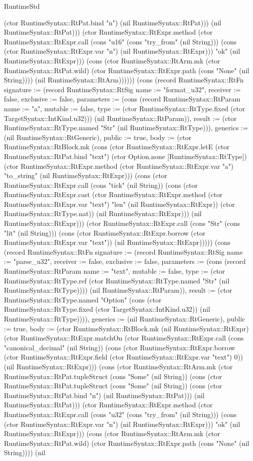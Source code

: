 \begin{lexlean}{RuntimeStd}
\begin{semanticmodule}
{(ctor RuntimeSyntax::RtPat.bind "n") (nil RuntimeSyntax::RtPat))) (nil RuntimeSyntax::RtPat))) (ctor RuntimeSyntax::RtExpr.method (ctor RuntimeSyntax::RtExpr.call (cons "u16" (cons "try_from" (nil String))) (cons (ctor RuntimeSyntax::RtExpr.var "n") (nil RuntimeSyntax::RtExpr))) "ok" (nil RuntimeSyntax::RtExpr))) (cons (ctor RuntimeSyntax::RtArm.mk (ctor RuntimeSyntax::RtPat.wild) (ctor RuntimeSyntax::RtExpr.path (cons "None" (nil String)))) (nil RuntimeSyntax::RtArm)))))}) (cons (record RuntimeSyntax::RtFn {signature := (record RuntimeSyntax::RtSig {name := "format_u32", receiver := false, exclusive := false, parameters := (cons (record RuntimeSyntax::RtParam {name := "a", mutable := false, type := (ctor RuntimeSyntax::RtType.fixed (ctor TargetSyntax::IntKind.u32))}) (nil RuntimeSyntax::RtParam)), result := (ctor RuntimeSyntax::RtType.named "Str" (nil RuntimeSyntax::RtType))}), generics := (nil RuntimeSyntax::RtGeneric), public := true, body := (ctor RuntimeSyntax::RtBlock.mk (cons (ctor RuntimeSyntax::RtExpr.letE (ctor RuntimeSyntax::RtPat.bind "text") (ctor Option.none [RuntimeSyntax::RtType]) (ctor RuntimeSyntax::RtExpr.method (ctor RuntimeSyntax::RtExpr.var "a") "to_string" (nil RuntimeSyntax::RtExpr))) (cons (ctor RuntimeSyntax::RtExpr.call (cons "tick" (nil String)) (cons (ctor RuntimeSyntax::RtExpr.cast (ctor RuntimeSyntax::RtExpr.method (ctor RuntimeSyntax::RtExpr.var "text") "len" (nil RuntimeSyntax::RtExpr)) (ctor RuntimeSyntax::RtType.nat)) (nil RuntimeSyntax::RtExpr))) (nil RuntimeSyntax::RtExpr))) (ctor RuntimeSyntax::RtExpr.call (cons "Str" (cons "lit" (nil String))) (cons (ctor RuntimeSyntax::RtExpr.borrow (ctor RuntimeSyntax::RtExpr.var "text")) (nil RuntimeSyntax::RtExpr))))}) (cons (record RuntimeSyntax::RtFn {signature := (record RuntimeSyntax::RtSig {name := "parse_u32", receiver := false, exclusive := false, parameters := (cons (record RuntimeSyntax::RtParam {name := "text", mutable := false, type := (ctor RuntimeSyntax::RtType.ref (ctor RuntimeSyntax::RtType.named "Str" (nil RuntimeSyntax::RtType)))}) (nil RuntimeSyntax::RtParam)), result := (ctor RuntimeSyntax::RtType.named "Option" (cons (ctor RuntimeSyntax::RtType.fixed (ctor TargetSyntax::IntKind.u32)) (nil RuntimeSyntax::RtType)))}), generics := (nil RuntimeSyntax::RtGeneric), public := true, body := (ctor RuntimeSyntax::RtBlock.mk (nil RuntimeSyntax::RtExpr) (ctor RuntimeSyntax::RtExpr.matchOn (ctor RuntimeSyntax::RtExpr.call (cons "canonical_decimal" (nil String)) (cons (ctor RuntimeSyntax::RtExpr.borrow (ctor RuntimeSyntax::RtExpr.field (ctor RuntimeSyntax::RtExpr.var "text") 0)) (nil RuntimeSyntax::RtExpr))) (cons (ctor RuntimeSyntax::RtArm.mk (ctor RuntimeSyntax::RtPat.tupleStruct (cons "Some" (nil String)) (cons (ctor RuntimeSyntax::RtPat.tupleStruct (cons "Some" (nil String)) (cons (ctor RuntimeSyntax::RtPat.bind "n") (nil RuntimeSyntax::RtPat))) (nil RuntimeSyntax::RtPat))) (ctor RuntimeSyntax::RtExpr.method (ctor RuntimeSyntax::RtExpr.call (cons "u32" (cons "try_from" (nil String))) (cons (ctor RuntimeSyntax::RtExpr.var "n") (nil RuntimeSyntax::RtExpr))) "ok" (nil RuntimeSyntax::RtExpr))) (cons (ctor RuntimeSyntax::RtArm.mk (ctor RuntimeSyntax::RtPat.wild) (ctor RuntimeSyntax::RtExpr.path (cons "None" (nil String)))) (nil }
\end{semanticmodule}
\end{lexlean}
